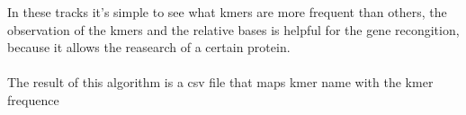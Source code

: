 In these tracks it's simple to see what kmers are more frequent than others, the observation of the kmers and the relative bases is helpful for the gene recongition, because it allows the reasearch of a certain protein.\\\\
The result of this algorithm is a csv file that maps kmer name with the kmer frequence				
